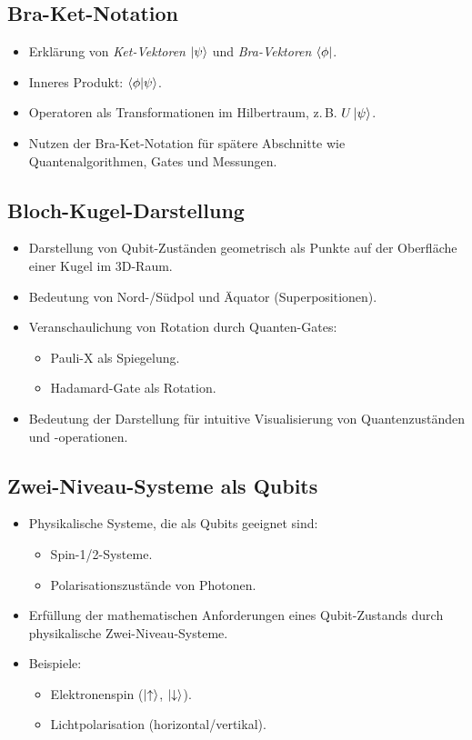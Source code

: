\subsection{Bra-Ket-Notation}
\begin{itemize}
    \item Erklärung von \textit{Ket-Vektoren} $\ket{\psi}$ und \textit{Bra-Vektoren} $\bra{\phi}$.
    \item Inneres Produkt: $\braket{\phi | \psi}$.
    \item Operatoren als Transformationen im Hilbertraum, z. B. $U \ket{\psi}$.
    \item Nutzen der Bra-Ket-Notation für spätere Abschnitte wie Quantenalgorithmen, Gates und Messungen.
\end{itemize}

\subsection{Bloch-Kugel-Darstellung}
\begin{itemize}
    \item Darstellung von Qubit-Zuständen geometrisch als Punkte auf der Oberfläche einer Kugel im 3D-Raum.
    \item Bedeutung von Nord-/Südpol und Äquator (Superpositionen).
    \item Veranschaulichung von Rotation durch Quanten-Gates:
    \begin{itemize}
        \item Pauli-X als Spiegelung.
        \item Hadamard-Gate als Rotation.
    \end{itemize}
    \item Bedeutung der Darstellung für intuitive Visualisierung von Quantenzuständen und -operationen.
\end{itemize}

\subsection{Zwei-Niveau-Systeme als Qubits}
\begin{itemize}
    \item Physikalische Systeme, die als Qubits geeignet sind:
    \begin{itemize}
        \item Spin-1/2-Systeme.
        \item Polarisationszustände von Photonen.
    \end{itemize}
    \item Erfüllung der mathematischen Anforderungen eines Qubit-Zustands durch physikalische Zwei-Niveau-Systeme.
    \item Beispiele:
    \begin{itemize}
        \item Elektronenspin ($\ket{\uparrow}$, $\ket{\downarrow}$).
        \item Lichtpolarisation (horizontal/vertikal).
    \end{itemize}
\end{itemize}


